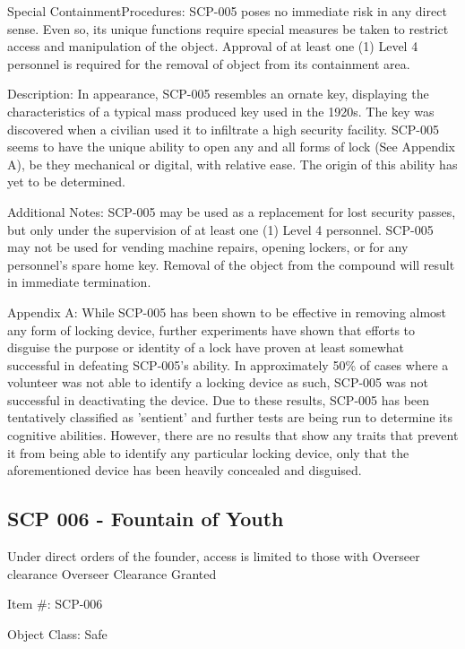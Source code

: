 \documentclass[a4paper, 11pt]{article}
\begin{document}
Special Containment\linebreak Procedures: SCP-005 poses no immediate risk in any direct sense. Even so, its unique functions require special measures be taken to restrict access and manipulation of the object. Approval of at least one (1) Level 4 personnel is required for the removal of object from its containment area.

Description: In appearance, SCP-005 resembles an ornate key, displaying the characteristics of a typical mass produced key used in the 1920s. The key was discovered when a civilian used it to infiltrate a high security facility. SCP-005 seems to have the unique ability to open any and all forms of lock (See Appendix A), be they mechanical or digital, with relative ease. The origin of this ability has yet to be determined.

Additional Notes: SCP-005 may be used as a replacement for lost security passes, but only under the supervision of at least one (1) Level 4 personnel. SCP-005 may not be used for vending machine repairs, opening lockers, or for any personnel's spare home key. Removal of the object from the compound will result in immediate termination.

Appendix A: While SCP-005 has been shown to be effective in removing almost any form of locking device, further experiments have shown that efforts to disguise the purpose or identity of a lock have proven at least somewhat successful in defeating SCP-005's ability. In approximately 50\% of cases where a volunteer was not able to identify a locking device as such, SCP-005 was not successful in deactivating the device. Due to these results, SCP-005 has been tentatively classified as 'sentient' and further tests are being run to determine its cognitive abilities. However, there are no results that show any traits that prevent it from being able to identify any particular locking device, only that the aforementioned device has been heavily concealed and disguised.

\subsection{SCP 006 - Fountain of Youth}
Under direct orders of the founder, access is limited to those with Overseer clearance
Overseer Clearance Granted

Item \#: SCP-006

Object Class: Safe
\end{document}
